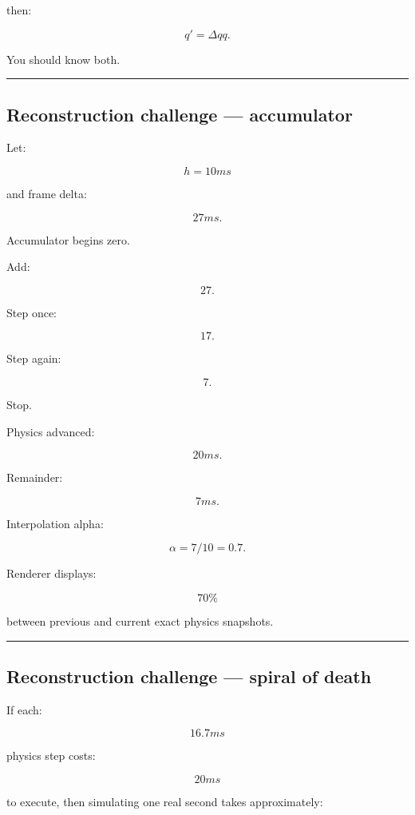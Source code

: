 then:

\[
q'
=
\Delta q q.
\]

You should know both.

\begin{center}\rule{0.5\linewidth}{0.5pt}\end{center}

\subsection{Reconstruction challenge --- accumulator}\label{06-engine-ii-ch038-reconstruction-challenge-accumulator}

Let:

\[
h=10ms
\]

and frame delta:

\[
27ms.
\]

Accumulator begins zero.

Add:

\[
27.
\]

Step once:

\[
17.
\]

Step again:

\[
7.
\]

Stop.

Physics advanced:

\[
20ms.
\]

Remainder:

\[
7ms.
\]

Interpolation alpha:

\[
\alpha
=
7/10
=
0.7.
\]

Renderer displays:

\[
70\%
\]

between previous and current exact physics snapshots.

\begin{center}\rule{0.5\linewidth}{0.5pt}\end{center}

\subsection{Reconstruction challenge --- spiral of death}\label{06-engine-ii-ch038-reconstruction-challenge-spiral-of-death}

If each:

\[
16.7ms
\]

physics step costs:

\[
20ms
\]

to execute, then simulating one real second takes approximately:

